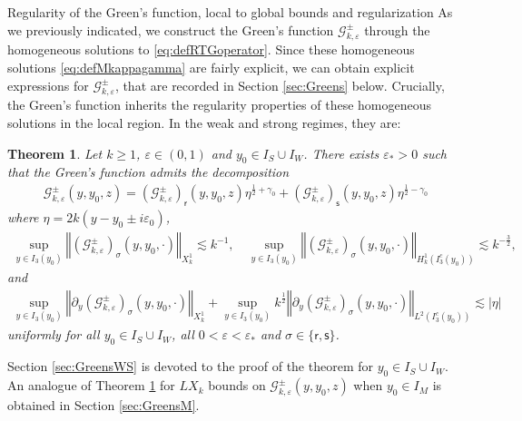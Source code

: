 \documentclass[11pt,reqno]{amsproc}
\makeatletter
\renewcommand\subsection{\@startsection{subsection}{2}%
\normalparindent{.5\linespacing\@plus.7\linespacing}{-.5em}
{\normalfont\bfseries}}
\newtheorem{theorem}[proposition]{Theorem}
\theoremstyle{definition}
\numberwithin{equation}{section}
\newcommand{\G}{{\mathcal{G}}}
\newcommand{\sr}{{\mathsf{r}}}
\newcommand{\s}{{\mathsf{s}}}
\newcommand{\ep}{\varepsilon}
\makeatother
\begin{document}
\subsection{Regularity of the Green's function, local to global bounds and regularization}
As we previously indicated, we construct the Green's function $\G_{k,\ep}^\pm$ through the homogeneous solutions to \eqref{eq:defRTGoperator}. Since these homogeneous solutions \eqref{eq:defMkappagamma} are fairly explicit, we can obtain explicit expressions for $\G_{k,\ep}
^\pm$, that are recorded in Section \ref{sec:Greens} below. Crucially, the Green's function inherits the regularity properties of these homogeneous solutions in the local region. In the weak and strong regimes, they are:

\begin{theorem}\label{thm:XkregGSW}
Let $k\geq 1$, $\ep\in (0,1)$ and $y_0\in I_S \cup I_W$. There exists $\ep_*>0$ such that the Green's function admits the decomposition
\begin{align*}
\G_{k,\ep}^\pm(y,y_0,z) = \left( \G_{k,\ep}^\pm\right)_\sr(y,y_0,z) \eta^{\frac12 + \gamma_0} + \left( \G_{k,\ep}^\pm\right)_\s(y,y_0,z) \eta^{\frac12 - \gamma_0}
\end{align*}
where $\eta=2k(y-y_0\pm i\ep_0)$, 
\begin{align*}
\sup_{y\in I_3(y_0)} \left\Vert \left( \G_{k,\ep}^\pm\right)_\sigma(y,y_0,\cdot) \right\Vert_{X_k^1} \lesssim k^{-1}, \quad \sup_{y\in I_3(y_0)} \left\Vert \left( \G_{k,\ep}^\pm\right)_\sigma(y,y_0,\cdot) \right\Vert_{H_k^1(I_3^c(y_0))} \lesssim k^{-\frac32},
\end{align*}
and
\begin{align*}
\sup_{y\in I_3(y_0)} \left\Vert \partial_y\left( \G_{k,\ep}^\pm\right)_\sigma(y,y_0,\cdot) \right\Vert_{X_k^1} + \sup_{y\in I_3(y_0)}  k^\frac12 \left\Vert \partial_y\left( \G_{k,\ep}^\pm \right)_\sigma(y,y_0,\cdot) \right \Vert_{L^2(I_3^c(y_0))}\lesssim |\eta|
\end{align*}
uniformly for all $y_0\in I_S\cup I_W$, all $0<\ep<\ep_*$ and $\sigma\in \lbrace \sr, \s \rbrace$. 
\end{theorem}

Section \ref{sec:GreensWS} is devoted to the proof of the theorem for $y_0\in I_S\cup I_W$. An analogue of Theorem \ref{thm:XkregGSW} for $LX_k$ bounds on $\G_{k,\ep}^\pm(y,y_0,z)$ when $y_0\in I_M$ is obtained in Section \ref{sec:GreensM}.
\end{document}
